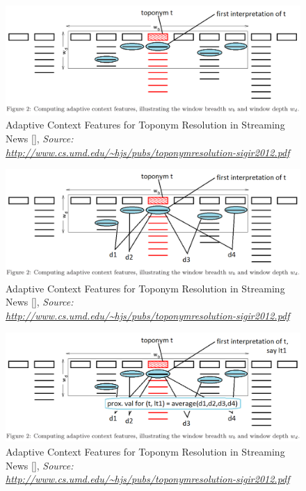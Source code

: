 \documentclass{beamer}
\begin{document}
{\begin{overprint}
		\begin{figure}
			\includegraphics[width=\textwidth]{adaptive-proximity-k.png} 
			\caption{Adaptive Context Features for Toponym Resolution in Streaming News [], \textit{Source: \url{http://www.cs.umd.edu/~hjs/pubs/toponymresolution-sigir2012.pdf}}}
		\end{figure}
		
		\begin{figure}
			\includegraphics[width=\textwidth]{adaptive-proximity-k1.png} 
			\caption{Adaptive Context Features for Toponym Resolution in Streaming News [], \textit{Source: \url{http://www.cs.umd.edu/~hjs/pubs/toponymresolution-sigir2012.pdf}}}
		\end{figure}
		
		\begin{figure}
			\includegraphics[width=\textwidth]{adaptive-proximity-k2.png} 
			\caption{Adaptive Context Features for Toponym Resolution in Streaming News [], \textit{Source: \url{http://www.cs.umd.edu/~hjs/pubs/toponymresolution-sigir2012.pdf}}}
		\end{figure}
		

\end{overprint}}
\end{document}
